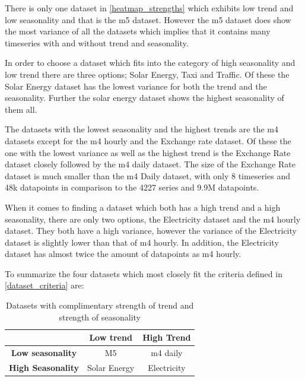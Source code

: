There is only one dataset in \ref{heatmap_strengths} which exhibits low trend and low seasonality and that is the m5 dataset. However the m5 dataset does show the most variance of all the datasets which implies that it contains many timeseries with and without trend and seasonality.

In order to choose a dataset which fits into the category of high seasonality and low trend there are three options; Solar Energy, Taxi and Traffic. Of these the Solar Energy dataset has the lowest variance for both the trend and the seasonality. Further the solar energy dataset shows the highest seasonality of them all.

The datasets with the lowest seasonality and the highest trends are the m4 datasets except for the m4 hourly and the Exchange rate dataset. Of these the one with the lowest variance as well as the highest trend is the Exchange Rate dataset closely followed by the m4 daily dataset. The size of the Exchange Rate dataset is much smaller than the m4 Daily dataset, with only 8 timeseries and 48k datapoints in comparison to the 4227 series and 9.9M datapoints.

When it comes to finding a dataset which both has a high trend and a high seasonality, there are only two options, the Electricity dataset and the m4 hourly dataset. They both have a high variance, however the variance of the Electricity dataset is slightly lower than that of m4 hourly. In addition, the Electricity dataset has almost twice the amount of datapoints as m4 hourly.

To summarize the four datasets which most closely fit the criteria defined in \ref{dataset_criteria} are:

\begin{table}[htp]
  \centering
  \begin{tabular}{ccc} %
                           & {\bf Low trend } & {\bf High Trend} \\
    \hline %
    {\bf Low seasonality}  & M5               & m4 daily         \\
    \hline
    {\bf High Seasonality} & Solar Energy     & Electricity      \\
  \end{tabular}
  \caption{Datasets with complimentary strength of trend and strength of seasonality}
  \label{fig:representative_subset_of_datasets}
\end{table}

